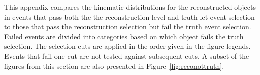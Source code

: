 

This appendix compares the kinematic distributions for the reconstructed objects in events that pass both the
the reconstruction level and truth let event selection to those that pass the reconstruction selection 
but fail the truth event selection.   Failed events are divided into categories based on which object fails
the truth selection.  The selection cuts are applied in the order given in the figure legends.  Events that
fail one cut are not tested against subsequent cuts.  A subset of the figures from this section are also presented
in Figure~\ref{fig:reconottruth}. 

